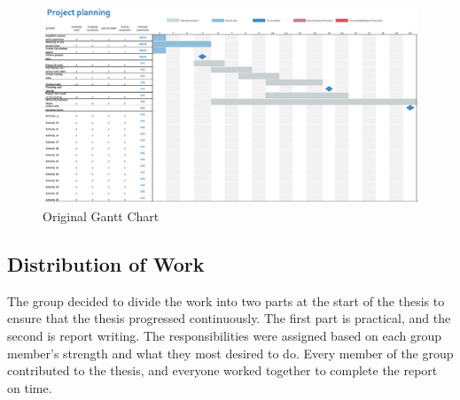 \vspace{2mm}
\begin{figure}[H]
    \centering
    \includegraphics[width=0.9\columnwidth]{Images/gantt2.jpg}
    \caption{Original Gantt Chart}
    \label{fig: Original Gantt Chart}
\end{figure}


\subsection{Distribution of Work}
The group decided to divide the work into two parts at the start of the thesis to ensure that the thesis progressed continuously. The first part is practical, and the second is report writing. The responsibilities were assigned based on each group member's strength and what they most desired to do. Every member of the group contributed to the thesis, and everyone worked together to complete the report on time. 


